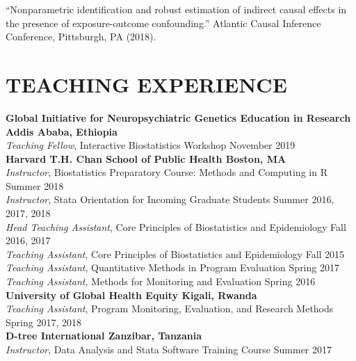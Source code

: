 \documentclass[12pt]{article}
\begin{document}
``Nonparametric identification and robust estimation of indirect causal effects in the presence of exposure-outcome confounding.'' Atlantic Causal Inference Conference, Pittsburgh, PA (2018). 



\section*{\textbf{{\large T}{EACHING} {\large E}{XPERIENCE}}}
\textbf{Global Initiative for Neuropsychiatric Genetics Education in Research \hfill \hfill Addis Ababa, Ethiopia} \\
\textit{Teaching Fellow}, Interactive Biostatistics Workshop \hfill \hfill November 2019 \\

\textbf{Harvard T.H. Chan School of Public Health \hfill \hfill Boston, MA} \\
\textit{Instructor}, Biostatistics Preparatory Course: Methods and Computing in R \hfill \hfill Summer 2018 \\
\textit{Instructor}, Stata Orientation for Incoming Graduate Students \hfill \hfill	Summer 2016, 2017, 2018\\
\textit{Head Teaching Assistant}, Core Principles of Biostatistics and Epidemiology \hfill \hfill Fall 2016, 2017 \\
\textit{Teaching Assistant}, Core Principles of Biostatistics and Epidemiology \hfill \hfill Fall 2015 \\
\textit{Teaching Assistant}, Quantitative Methods in Program Evaluation \hfill \hfill Spring 2017 \\
\textit{Teaching Assistant}, Methods for Monitoring and Evaluation \hfill \hfill Spring 2016 \\

\textbf{University of Global Health Equity \hfill \hfill Kigali, Rwanda} \\
\textit{Teaching Assistant}, Program Monitoring, Evaluation, and Research Methods  \hfill \hfill Spring 2017, 2018 \\

\textbf{D-tree International \hfill \hfill Zanzibar, Tanzania}\\
\textit{Instructor}, Data Analysis and Stata Software Training Course \hfill \hfill Summer 2017  \\
\end{document}
